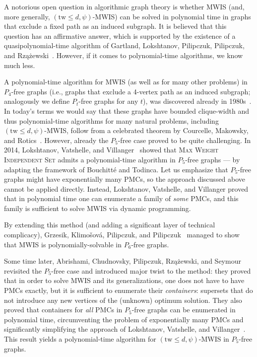 \documentclass[11pt,a4paper]{article}
\theoremstyle{definition}
\begin{document}
A notorious open question in algorithmic graph theory is whether MWIS (and, more generally, $(\mathrm{tw} \leq d,\psi)$-MWIS) can be solved in polynomial time in graphs that exclude a fixed path as an induced subgraph.
It is believed that this question has an affirmative answer,
which is supported by the existence of a quasipolynomial-time algorithm of Gartland, Lokshtanov, Pilipczuk, Pilipczuk, and Rzążewski~\cite{DBLP:conf/focs/GartlandL20,DBLP:conf/sosa/PilipczukPR21,DBLP:conf/stoc/GartlandLPPR21}.
However, if it comes to polynomial-time algorithms, we know much less.

A polynomial-time algorithm for MWIS (as well as for many other problems) in $P_4$-free graphs (i.e., graphs that exclude a 4-vertex path as an induced subgraph; analogously we define $P_t$-free graphs for any $t$), was discovered already in 1980s~\cite{DBLP:journals/siamcomp/CorneilPS85}.
In today's terms we would say that these graphs have bounded clique-width and thus polynomial-time algorithms for many natural problems, including $(\mathrm{tw} \leq d,\psi)$-MWIS, follow from a celebrated theorem by Courcelle, Makowsky, and Rotics~\cite{DBLP:conf/wg/CourcelleMR98}.
However, already the $P_5$-free case proved to be quite challenging.
In 2014, Lokshtanov, Vatshelle, and Villanger~\cite{DBLP:conf/soda/LokshantovVV14} showed that \textsc{Max Weight Independent Set} admits a polynomial-time algorithm in $P_5$-free graphs --- by adapting the framework of Bouchitt\'e and Todinca. Let us emphasize that $P_5$-free graphs might have exponentially many PMCs, so the approach discussed above cannot be applied directly. Instead, Lokshtanov, Vatshelle, and Villanger proved that in polynomial time one can enumerate a family of \emph{some} PMCs, and this family is sufficient to solve MWIS via dynamic programming.

By extending this method (and adding a significant layer of technical complicacy), Grzesik, Klimo\v{s}ov\'a, Pilipczuk, and Pilipczuk~\cite{grzesik2020polynomialtime} managed to show that MWIS is polynomially-solvable in $P_6$-free graphs.

Some time later, Abrishami, Chudnovsky, Pilipczuk, Rzążewski, and Seymour~\cite{Tara} revisited the $P_5$-free case and introduced major twist to the method: they proved that in order to solve MWIS and its generalizations, one does not have to have PMCs exactly, but it is sufficient to enumerate their \emph{containers}: supersets that do not introduce any new vertices of the (unknown) optimum solution. They also proved that containers for \emph{all} PMCs in $P_5$-free graphs can be enumerated in polynomial time, circumventing the problem of exponentially many PMCs and significantly simplifying the approach of Lokshtanov, Vatshelle, and Villanger~\cite{DBLP:conf/soda/LokshantovVV14}.
This result yields a polynomial-time algorithm for $(\mathrm{tw} \leq d,\psi)$-MWIS in $P_5$-free graphs.
\end{document}
